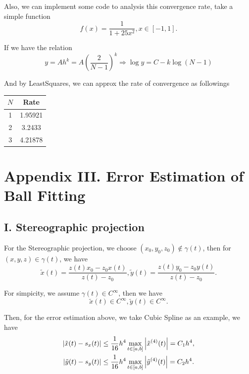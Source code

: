 \documentclass[a4paper]{article}
\begin{document}
Also, we can implement some code to analysis this convergence rate, take a simple function 
\begin{equation}
    f(x) = \frac{1}{1 + 25 x^2}, x\in [-1, 1].
\end{equation}

If we have the relation 
\begin{equation}
    y = A h^k = A (\frac{2}{N-1})^k \Rightarrow \log y = C - k \log (N-1)
\end{equation}

And by LeastSquares, we can approx the rate of convergence as followings 
\begin{table}[H]
    \centering
    \begin{tabular}{|c|c|}
        \hline
        $N$ & Rate \\
        \hline
        1 & 1.95921 \\
        2 & 3.2433 \\
        3 & 4.21878 \\
        \hline
    \end{tabular}
\end{table}


\section{Appendix III. Error Estimation of Ball Fitting}

\subsection{I. Stereographic projection}

For the Stereographic projection, we choose $(x_0, y_0, z_0) \notin \gamma (t)$, then for $(x,y,z) \in \gamma (t)$, we have
\begin{equation}
    \tilde{x}(t) = \frac{z(t) x_0 - z_0 x(t)}{z(t)-z_0}, \tilde{y}(t) = \frac{z(t) y_0 - z_0 y(t)}{z(t)-z_0}.
\end{equation}

For simpicity, we assume $\gamma (t) \in C^{\infty}$, then we have
\begin{equation}
    \tilde{x}(t) \in C^{\infty}, \tilde{y}(t) \in C^{\infty}.
\end{equation}

Then, for the error estimation above, we take Cubic Spline as an example, we have 
\begin{equation}
    \begin{aligned}
        \abs{\tilde{x}(t) - s_x(t)} &\leq \frac{1}{16} h^4 \max_{t \in [a,b]} \abs{\tilde{x}^{(4)}(t)} = C_1 h^4, \\
        \abs{\tilde{y}(t) - s_y(t)} &\leq \frac{1}{16} h^4 \max_{t \in [a,b]} \abs{\tilde{y}^{(4)}(t)} = C_2 h^4.
    \end{aligned}
\end{equation}
\end{document}

